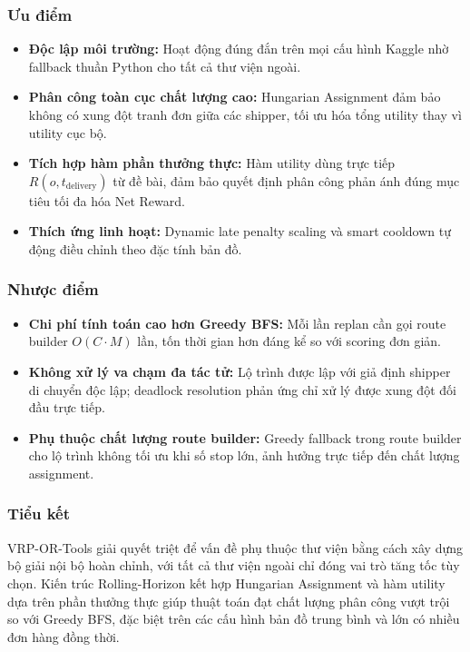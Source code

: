 \documentclass[conference]{IEEEtran}
\begin{document}
\subsubsection{Ưu điểm}
\begin{itemize}
    \item \textbf{Độc lập môi trường:} Hoạt động đúng đắn trên mọi cấu hình Kaggle nhờ fallback thuần Python cho tất cả thư viện ngoài.
    \item \textbf{Phân công toàn cục chất lượng cao:} Hungarian Assignment đảm bảo không có xung đột tranh đơn giữa các shipper, tối ưu hóa tổng utility thay vì utility cục bộ.
    \item \textbf{Tích hợp hàm phần thưởng thực:} Hàm utility dùng trực tiếp $R(o, t_{\text{delivery}})$ từ đề bài, đảm bảo quyết định phân công phản ánh đúng mục tiêu tối đa hóa Net Reward.
    \item \textbf{Thích ứng linh hoạt:} Dynamic late penalty scaling và smart cooldown tự động điều chỉnh theo đặc tính bản đồ.
\end{itemize}
 
\subsubsection{Nhược điểm}
\begin{itemize}
    \item \textbf{Chi phí tính toán cao hơn Greedy BFS:} Mỗi lần replan cần gọi route builder $O(C \cdot M)$ lần, tốn thời gian hơn đáng kể so với scoring đơn giản.
    \item \textbf{Không xử lý va chạm đa tác tử:} Lộ trình được lập với giả định shipper di chuyển độc lập; deadlock resolution phản ứng chỉ xử lý được xung đột đối đầu trực tiếp.
    \item \textbf{Phụ thuộc chất lượng route builder:} Greedy fallback trong route builder cho lộ trình không tối ưu khi số stop lớn, ảnh hưởng trực tiếp đến chất lượng assignment.
\end{itemize}
 
\subsubsection{Tiểu kết}
VRP-OR-Tools giải quyết triệt để vấn đề phụ thuộc thư viện bằng cách xây dựng bộ giải nội bộ hoàn chỉnh, với tất cả thư viện ngoài chỉ đóng vai trò tăng tốc tùy chọn. Kiến trúc Rolling-Horizon kết hợp Hungarian Assignment và hàm utility dựa trên phần thưởng thực giúp thuật toán đạt chất lượng phân công vượt trội so với Greedy BFS, đặc biệt trên các cấu hình bản đồ trung bình và lớn có nhiều đơn hàng đồng thời.
\end{document}
